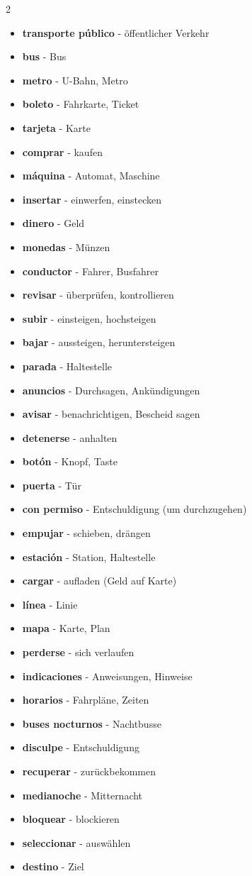 \documentclass[12pt,a4paper]{article}
\begin{document}
\begin{multicols}{2}
\begin{itemize}[leftmargin=*]
    \item \textbf{transporte público} - öffentlicher Verkehr
    \item \textbf{bus} - Bus
    \item \textbf{metro} - U-Bahn, Metro
    \item \textbf{boleto} - Fahrkarte, Ticket
    \item \textbf{tarjeta} - Karte
    \item \textbf{comprar} - kaufen
    \item \textbf{máquina} - Automat, Maschine
    \item \textbf{insertar} - einwerfen, einstecken
    \item \textbf{dinero} - Geld
    \item \textbf{monedas} - Münzen
    \item \textbf{conductor} - Fahrer, Busfahrer
    \item \textbf{revisar} - überprüfen, kontrollieren
    \item \textbf{subir} - einsteigen, hochsteigen
    \item \textbf{bajar} - aussteigen, heruntersteigen
    \item \textbf{parada} - Haltestelle
    \item \textbf{anuncios} - Durchsagen, Ankündigungen
    \item \textbf{avisar} - benachrichtigen, Bescheid sagen
    \item \textbf{detenerse} - anhalten
    \item \textbf{botón} - Knopf, Taste
    \item \textbf{puerta} - Tür
    \item \textbf{con permiso} - Entschuldigung (um durchzugehen)
    \item \textbf{empujar} - schieben, drängen
    \item \textbf{estación} - Station, Haltestelle
    \item \textbf{cargar} - aufladen (Geld auf Karte)
    \item \textbf{línea} - Linie
    \item \textbf{mapa} - Karte, Plan
    \item \textbf{perderse} - sich verlaufen
    \item \textbf{indicaciones} - Anweisungen, Hinweise
    \item \textbf{horarios} - Fahrpläne, Zeiten
    \item \textbf{buses nocturnos} - Nachtbusse
    \item \textbf{disculpe} - Entschuldigung
    \item \textbf{recuperar} - zurückbekommen
    \item \textbf{medianoche} - Mitternacht
    \item \textbf{bloquear} - blockieren
    \item \textbf{seleccionar} - auswählen
    \item \textbf{destino} - Ziel
\end{itemize}
\end{multicols}
\end{document}
